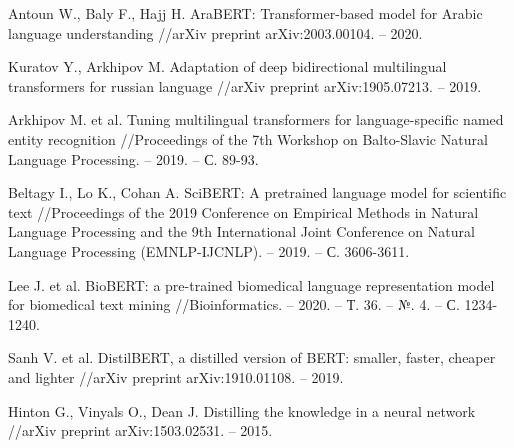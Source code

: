\begin{thebibliography}{00}
    Antoun W., Baly F., Hajj H. AraBERT: Transformer-based model for Arabic language understanding //arXiv preprint arXiv:2003.00104. – 2020.
    
    Kuratov Y., Arkhipov M. Adaptation of deep bidirectional multilingual transformers for russian language //arXiv preprint arXiv:1905.07213. – 2019.
    
    Arkhipov M. et al. Tuning multilingual transformers for language-specific named entity recognition //Proceedings of the 7th Workshop on Balto-Slavic Natural Language Processing. – 2019. – С. 89-93.
    
    Beltagy I., Lo K., Cohan A. SciBERT: A pretrained language model for scientific text //Proceedings of the 2019 Conference on Empirical Methods in Natural Language Processing and the 9th International Joint Conference on Natural Language Processing (EMNLP-IJCNLP). – 2019. – С. 3606-3611.
    
    Lee J. et al. BioBERT: a pre-trained biomedical language representation model for biomedical text mining //Bioinformatics. – 2020. – Т. 36. – №. 4. – С. 1234-1240.
    
    Sanh V. et al. DistilBERT, a distilled version of BERT: smaller, faster, cheaper and lighter //arXiv preprint arXiv:1910.01108. – 2019.
    
    Hinton G., Vinyals O., Dean J. Distilling the knowledge in a neural network //arXiv preprint arXiv:1503.02531. – 2015.
    

\end{thebibliography}
\endgroup

\clearpage
